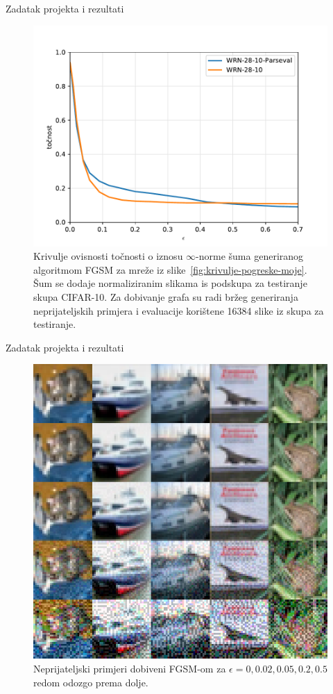 \documentclass{beamer}
\begin{document}
\begin{frame}{Zadatak projekta i rezultati}
\begin{figure}[htbp]
	\centering
	\includegraphics[width=0.65\linewidth]{ilustracije/grafovi/otpornost}
	\caption{
		Krivulje ovisnosti točnosti o iznosu $\infty$-norme šuma generiranog algoritmom FGSM za mreže iz slike~\ref{fig:krivulje-pogreske-moje}. Šum se dodaje normaliziranim slikama is podskupa za testiranje skupa CIFAR-10. Za dobivanje grafa su radi bržeg generiranja neprijateljskih primjera i evaluacije korištene 16384 slike iz skupa za testiranje.
	}
	\label{fig:krivulje-otpornosti}
\end{figure}
\end{frame}

\begin{frame}{Zadatak projekta i rezultati}
\begin{figure}[htbp]
	\centering
	\includegraphics[width=0.55\linewidth]{ilustracije/slike/np-eps025251}
	\caption{
		Neprijateljski primjeri dobiveni FGSM-om za $\epsilon=0,0.02,0.05,0.2,0.5$ redom odozgo prema dolje.
	}
	\label{fig:neprijateljski-primjeri}
\end{figure}
\end{frame}

%
\end{document}
